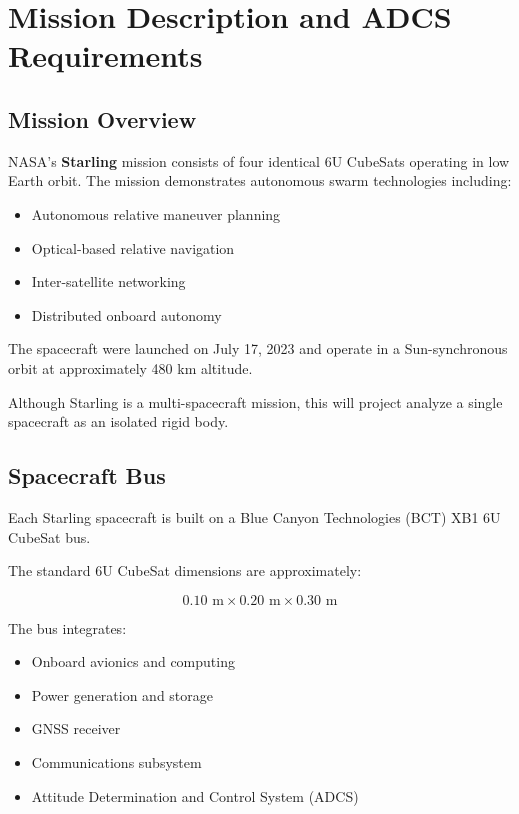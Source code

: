 \documentclass[12pt]{article}
\begin{document}

\section{Mission Description and ADCS Requirements}

\subsection{Mission Overview}

 NASA’s \textbf{Starling} mission consists of four identical 6U CubeSats operating in low Earth orbit. 
The mission demonstrates autonomous swarm technologies including:

\begin{itemize}
    \item Autonomous relative maneuver planning
    \item Optical-based relative navigation
    \item Inter-satellite networking
    \item Distributed onboard autonomy
\end{itemize}

The spacecraft were launched on July 17, 2023 and operate in a Sun-synchronous orbit at approximately 480 km altitude.

Although Starling is a multi-spacecraft mission, this will project analyze a single spacecraft as an isolated rigid body.

\subsection{Spacecraft Bus}

Each Starling spacecraft is built on a Blue Canyon Technologies (BCT) XB1 6U CubeSat bus. \cite{BCT_XB1}

The standard 6U CubeSat dimensions are approximately:

\[
0.10 \text{ m} \times 0.20 \text{ m} \times 0.30 \text{ m}
\]

The bus integrates:

\begin{itemize}
    \item Onboard avionics and computing
    \item Power generation and storage
    \item GNSS receiver
    \item Communications subsystem
    \item Attitude Determination and Control System (ADCS)
\end{itemize}
\end{document}
